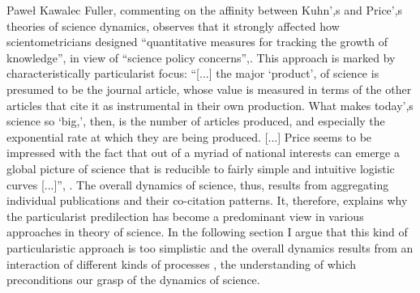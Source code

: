 \begin{artengenv}{Paweł Kawalec}
Fuller, commenting on the affinity between Kuhn',s and Price',s theories of science dynamics, observes that it strongly affected how scientometricians designed ``quantitative measures for tracking the growth of knowledge'', in view of ``science policy concerns'',. This approach is marked by characteristically particularist focus: ``[...] the major ‘product', of science is presumed to be the journal article, whose value is measured in terms of the other articles that cite it as instrumental in their own production. What makes today',s science so ‘big,', then, is the number of articles produced, and especially the exponential rate at which they are being produced. [...] Price seems to be impressed with the fact that out of a myriad of national interests can emerge a global picture of science that is reducible to fairly simple and intuitive logistic curves [...]'',
\parencite[][pp.270–271]{fuller_being_1992}. %
 The overall dynamics of science, thus, results from aggregating individual publications and their co-citation patterns. It, therefore, explains why the particularist predilection has become a predominant view in various approaches in theory of science. In the following section I argue that this kind of particularistic approach is too simplistic and the overall dynamics results from an interaction of different kinds of processes 
\parencite[][]{giovagnoli_cognitive_2020}, %
 the understanding of which preconditions our grasp of the dynamics of science.


\end{artengenv}
